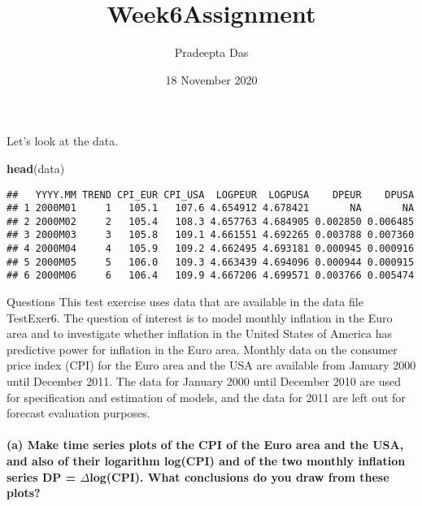 \documentclass[]{article}
\title{Week6Assignment}
\author{Pradeepta Das}
\date{18 November 2020}
\newenvironment{Shaded}{\begin{snugshade}}{\end{snugshade}}
\newcommand{\KeywordTok}[1]{\textcolor[rgb]{0.13,0.29,0.53}{\textbf{#1}}}
\newcommand{\NormalTok}[1]{#1}
\let\oldparagraph\paragraph
\renewcommand{\paragraph}[1]{\oldparagraph{#1}\mbox{}}
\begin{document}
\maketitle

Let's look at the data.

\begin{Shaded}
\begin{Highlighting}[]
\KeywordTok{head}\NormalTok{(data)}
\end{Highlighting}
\end{Shaded}

\begin{verbatim}
##   YYYY.MM TREND CPI_EUR CPI_USA  LOGPEUR  LOGPUSA    DPEUR    DPUSA
## 1 2000M01     1   105.1   107.6 4.654912 4.678421       NA       NA
## 2 2000M02     2   105.4   108.3 4.657763 4.684905 0.002850 0.006485
## 3 2000M03     3   105.8   109.1 4.661551 4.692265 0.003788 0.007360
## 4 2000M04     4   105.9   109.2 4.662495 4.693181 0.000945 0.000916
## 5 2000M05     5   106.0   109.3 4.663439 4.694096 0.000944 0.000915
## 6 2000M06     6   106.4   109.9 4.667206 4.699571 0.003766 0.005474
\end{verbatim}

Questions This test exercise uses data that are available in the data
file TestExer6. The question of interest is to model monthly inflation
in the Euro area and to investigate whether inflation in the United
States of America has predictive power for inflation in the Euro area.
Monthly data on the consumer price index (CPI) for the Euro area and the
USA are available from January 2000 until December 2011. The data for
January 2000 until December 2010 are used for specification and
estimation of models, and the data for 2011 are left out for forecast
evaluation purposes.

\hypertarget{a-make-time-series-plots-of-the-cpi-of-the-euro-area-and-the-usa-and-also-of-their-logarithm-logcpi-and-of-the-two-monthly-inflation-series-dp-deltalogcpi.-what-conclusions-do-you-draw-from-these-plots}{%
\paragraph{\texorpdfstring{(a) Make time series plots of the CPI of the
Euro area and the USA, and also of their logarithm log(CPI) and of the
two monthly inflation series DP = \(\Delta\)log(CPI). What conclusions
do you draw from these
plots?}{(a) Make time series plots of the CPI of the Euro area and the USA, and also of their logarithm log(CPI) and of the two monthly inflation series DP = \textbackslash Deltalog(CPI). What conclusions do you draw from these plots?}}\label{a-make-time-series-plots-of-the-cpi-of-the-euro-area-and-the-usa-and-also-of-their-logarithm-logcpi-and-of-the-two-monthly-inflation-series-dp-deltalogcpi.-what-conclusions-do-you-draw-from-these-plots}}
\end{document}
